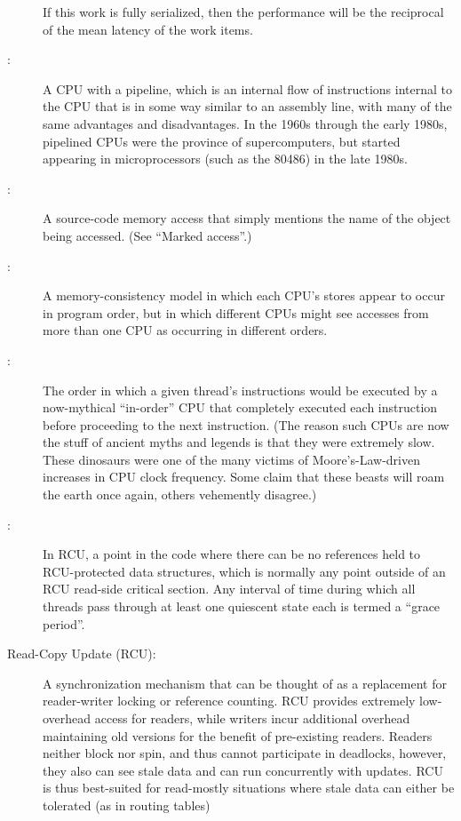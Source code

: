 \begin{description}
	If this work is fully serialized, then the performance will
	be the reciprocal of the mean latency of the work items.
\item[\IXr{Pipelined CPU}:]
	A CPU with a pipeline, which is
	an internal flow of instructions internal to the CPU that
	is in some way similar to an assembly line, with many of
	the same advantages and disadvantages.
	In the 1960s through the early 1980s, pipelined CPUs were the
	province of supercomputers, but started appearing in microprocessors
	(such as the 80486) in the late 1980s.
\item[\IX{Plain Access}:]
	A source-code memory access that simply mentions the name of
	the object being accessed.
	(See ``Marked access''.)
\item[\IXalthalt{Process Consistency}{process}{memory consistency}:]
	A memory-consistency model in which each CPU's stores appear to
	occur in program order, but in which different CPUs might see
	accesses from more than one CPU as occurring in different orders.
\item[\IX{Program Order}:]
	The order in which a given thread's instructions
	would be executed by a now-mythical ``in-order'' CPU that
	completely executed each instruction before proceeding to
	the next instruction.
	(The reason such CPUs are now the stuff of ancient myths
	and legends is that they were extremely slow.
	These dinosaurs were one of the many victims of
	Moore's-Law-driven increases in CPU clock frequency.
	Some claim that these beasts will roam the earth once again,
	others vehemently disagree.)
\item[\IX{Quiescent State}:]
	In RCU, a point in the code where there can be no references held
	to RCU-protected data structures, which is normally any point
	outside of an RCU read-side critical section.
	Any interval of time during which all threads pass through at
	least one quiescent state each is termed a ``grace period''.
\item[Read-Copy Update (RCU):]
	A synchronization mechanism that can be thought of as a replacement
	for reader-writer locking or reference counting.
	RCU provides extremely low-overhead access for readers, while
	writers incur additional overhead maintaining old versions
	for the benefit of pre-existing readers.
	Readers neither block nor spin, and thus cannot participate in
	deadlocks, however, they also can see stale data and can
	run concurrently with updates.
	RCU is thus best-suited for read-mostly situations where
	stale data can either be tolerated (as in routing tables)

\end{description}
